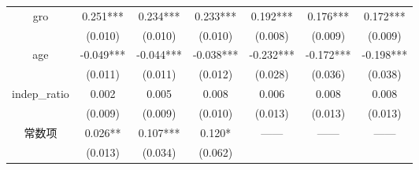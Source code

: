 \documentclass{beamer}	%
\theoremstyle{plain}
\theoremstyle{definition}
\theoremstyle{remark}
\numberwithin{equation}{section}
\begin{document}
\begin{frame}
\begin{table}[htbp]
\begin{tabular}{ccccccc}
		    \multirow{2}[0]{*}{gro}      &                   0.251***                    &                   0.234***                    &                   0.233***                   &                    0.192***                    &                    0.176***                    &                   0.172***                    \\
		                                 &                    (0.010)                    &                    (0.010)                    &                   (0.010)                    &                    (0.008)                     &                    (0.009)                     &                    (0.009)                    \\
		    \multirow{2}[0]{*}{age}      &                   -0.049***                   &                   -0.044***                   &                  -0.038***                   &                   -0.232***                    &                   -0.172***                    &                   -0.198***                   \\
		                                 &                    (0.011)                    &                    (0.011)                    &                   (0.012)                    &                    (0.028)                     &                    (0.036)                     &                    (0.038)                    \\
		\multirow{2}[0]{*}{indep\_ratio} &                     0.002                     &                     0.005                     &                    0.008                     &                     0.006                      &                     0.008                      &                     0.008                     \\
		                                 &                    (0.009)                    &                    (0.009)                    &                   (0.010)                    &                    (0.013)                     &                    (0.013)                     &                    (0.013)                    \\
		    \multirow{2}[0]{*}{常数项}      &                    0.026**                    &                   0.107***                    &                    0.120*                    &             \multirow{2}[0]{*}{——}             &             \multirow{2}[0]{*}{——}             &            \multirow{2}[0]{*}{——}             \\
		                                 &                    (0.013)                    &                    (0.034)                    &                   (0.062)                    &                                                &                                                &                                               \\

\end{tabular}
\end{table}
\end{frame}
\end{document}
